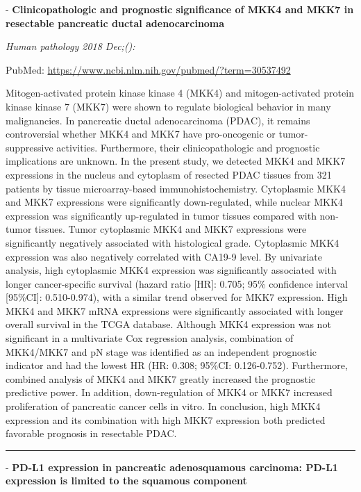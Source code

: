 \documentclass[]{article}
\begin{document}
 - \textbf{Clinicopathologic and prognostic significance of MKK4 and
MKK7 in resectable pancreatic ductal adenocarcinoma}

\emph{Human pathology 2018 Dec;():}

PubMed: \url{https://www.ncbi.nlm.nih.gov/pubmed/?term=30537492}

Mitogen-activated protein kinase kinase 4 (MKK4) and mitogen-activated
protein kinase kinase 7 (MKK7) were shown to regulate biological
behavior in many malignancies. In pancreatic ductal adenocarcinoma
(PDAC), it remains controversial whether MKK4 and MKK7 have
pro-oncogenic or tumor-suppressive activities. Furthermore, their
clinicopathologic and prognostic implications are unknown. In the
present study, we detected MKK4 and MKK7 expressions in the nucleus and
cytoplasm of resected PDAC tissues from 321 patients by tissue
microarray-based immunohistochemistry. Cytoplasmic MKK4 and MKK7
expressions were significantly down-regulated, while nuclear MKK4
expression was significantly up-regulated in tumor tissues compared with
non-tumor tissues. Tumor cytoplasmic MKK4 and MKK7 expressions were
significantly negatively associated with histological grade. Cytoplasmic
MKK4 expression was also negatively correlated with CA19-9 level. By
univariate analysis, high cytoplasmic MKK4 expression was significantly
associated with longer cancer-specific survival (hazard ratio {[}HR{]}:
0.705; 95\% confidence interval {[}95\%CI{]}: 0.510-0.974), with a
similar trend observed for MKK7 expression. High MKK4 and MKK7 mRNA
expressions were significantly associated with longer overall survival
in the TCGA database. Although MKK4 expression was not significant in a
multivariate Cox regression analysis, combination of MKK4/MKK7 and pN
stage was identified as an independent prognostic indicator and had the
lowest HR (HR: 0.308; 95\%CI: 0.126-0.752). Furthermore, combined
analysis of MKK4 and MKK7 greatly increased the prognostic predictive
power. In addition, down-regulation of MKK4 or MKK7 increased
proliferation of pancreatic cancer cells in vitro. In conclusion, high
MKK4 expression and its combination with high MKK7 expression both
predicted favorable prognosis in resectable PDAC.

{}

{}

\begin{center}\rule{0.5\linewidth}{\linethickness}\end{center}

 - \textbf{PD-L1 expression in pancreatic adenosquamous carcinoma: PD-L1
expression is limited to the squamous component}
\end{document}
